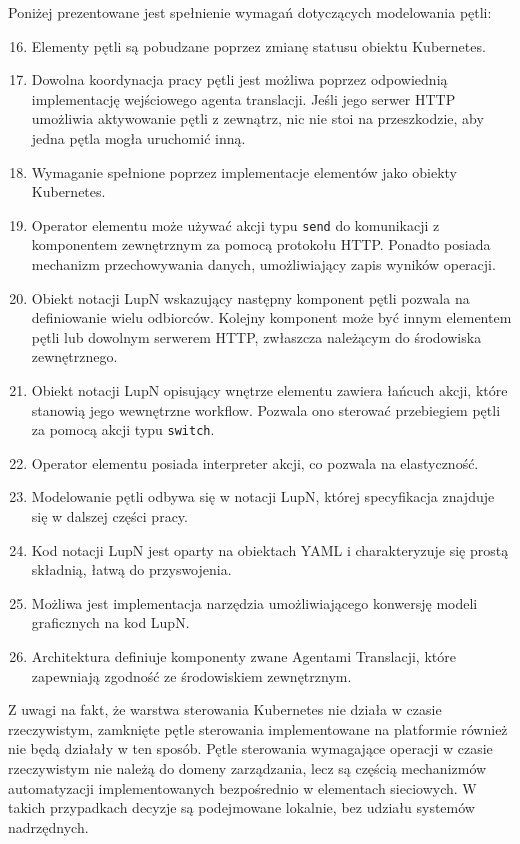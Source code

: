 Poniżej prezentowane jest spełnienie wymagań dotyczących modelowania pętli:
\begin{enumerate}
    \setcounter{enumi}{15}
    \item Elementy pętli są pobudzane poprzez zmianę statusu obiektu Kubernetes.
    \item Dowolna koordynacja pracy pętli jest możliwa poprzez odpowiednią implementację wejściowego agenta translacji. Jeśli jego serwer HTTP umożliwia aktywowanie pętli z zewnątrz, nic nie stoi na przeszkodzie, aby jedna pętla mogła uruchomić inną.
    \item Wymaganie spełnione poprzez implementacje elementów jako obiekty Kubernetes.
    \item Operator elementu może używać akcji typu \texttt{send} do komunikacji z komponentem zewnętrznym za pomocą protokołu HTTP. Ponadto posiada mechanizm przechowywania danych, umożliwiający zapis wyników operacji.
    \item Obiekt notacji LupN wskazujący następny komponent pętli pozwala na definiowanie wielu odbiorców. Kolejny komponent może być innym elementem pętli lub dowolnym serwerem HTTP, zwłaszcza należącym do środowiska zewnętrznego.
    \item Obiekt notacji LupN opisujący wnętrze elementu zawiera łańcuch akcji, które stanowią jego wewnętrzne workflow. Pozwala ono sterować przebiegiem pętli za pomocą akcji typu \texttt{switch}. 
    \item Operator elementu posiada interpreter akcji, co pozwala na elastyczność.
    \item Modelowanie pętli odbywa się w notacji LupN, której specyfikacja znajduje się w dalszej części pracy.
    \item Kod notacji LupN jest oparty na obiektach YAML i charakteryzuje się prostą składnią, łatwą do przyswojenia.
    \item Możliwa jest implementacja narzędzia umożliwiającego konwersję modeli graficznych na kod LupN.
    \item Architektura definiuje komponenty zwane Agentami Translacji, które zapewniają zgodność ze środowiskiem zewnętrznym.
\end{enumerate}

Z uwagi na fakt, że warstwa sterowania Kubernetes nie działa w czasie rzeczywistym, zamknięte pętle sterowania implementowane na platformie również nie będą działały w ten sposób. Pętle sterowania wymagające operacji w czasie rzeczywistym nie należą do domeny zarządzania, lecz są częścią mechanizmów automatyzacji implementowanych bezpośrednio w elementach sieciowych. W takich przypadkach decyzje są podejmowane lokalnie, bez udziału systemów nadrzędnych.